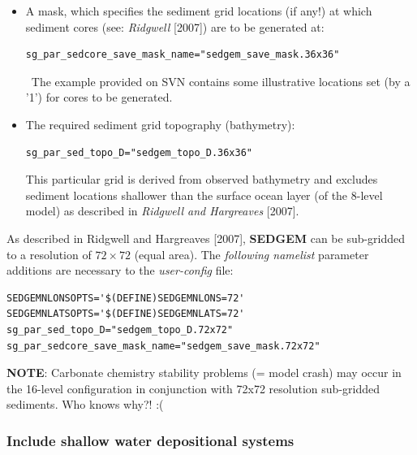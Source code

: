 \documentclass[11pt,fleqn]{book} %
\begin{document}
\begin{itemize}
        
\vspace{1mm}
        \item A mask, which specifies the sediment grid locations (if any!) at which sediment cores (see: \textit{Ridgwell} [2007]) are to be generated at:
\vspace{-1mm}\begin{verbatim}sg_par_sedcore_save_mask_name="sedgem_save_mask.36x36"\end{verbatim}\vspace{-1mm}\
The example provided on SVN contains some illustrative locations set (by a '\textsf{\footnotesize 1}') for cores to be generated.
        
\vspace{1mm}
\item The required sediment grid topography (bathymetry):
\vspace{-1mm}\begin{verbatim}sg_par_sed_topo_D="sedgem_topo_D.36x36"\end{verbatim}\vspace{-1mm}
        This particular grid is derived from observed bathymetry and excludes sediment locations shallower than the surface ocean layer (of the 8-level model) as described in \textit{Ridgwell and Hargreaves} [2007].
        
\end{itemize}

As described in Ridgwell and Hargreaves [2007], \textbf{SEDGEM} can be sub-gridded to a resolution of \(72\times 72\) (equal area). The \textit{following namelist} parameter additions are necessary to the \textit{user-config} file:
\small\vspace{-1mm}\begin{verbatim}
SEDGEMNLONSOPTS='$(DEFINE)SEDGEMNLONS=72'
SEDGEMNLATSOPTS='$(DEFINE)SEDGEMNLATS=72'
sg_par_sed_topo_D="sedgem_topo_D.72x72"
sg_par_sedcore_save_mask_name="sedgem_save_mask.72x72"
\end{verbatim}\vspace{-1mm}\normalsize

\textbf{NOTE}: Carbonate chemistry stability problems (= model crash) may occur in the 16-level configuration in conjunction with 72x72 resolution sub-gridded sediments. Who knows why?! :(

%
\subsubsection{Include shallow water depositional systems}\label{configure_reefs}
\end{document}

